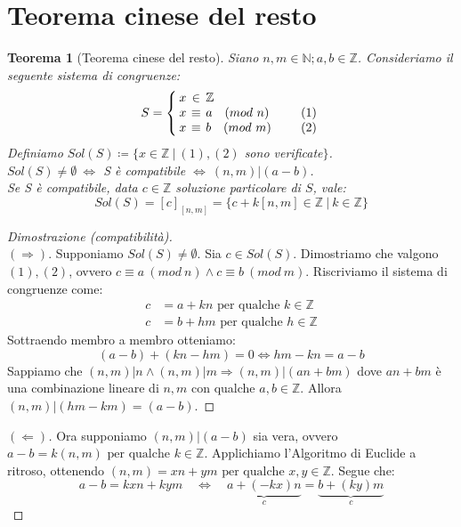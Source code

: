 \documentclass[12pt,twoscolu]{article}
\newcommand{\N}{\mathbb{N}}
\newcommand{\Z}{\mathbb{Z}}
\newcommand{\sesolose}{\Leftrightarrow}
\newcommand{\implica}{\Longrightarrow}
\newcommand{\pq}{\text{ per qualche }}
\renewcommand\qedsymbol{$\blacksquare$}
\newtheorem{theorem}{Teorema}
\begin{document}
\section{Teorema cinese del resto}
\begin{theorem}[Teorema cinese del resto]
Siano $n, m \in \N; a, b \in \Z$. Consideriamo il seguente sistema di congruenze:
\[
S = \left\{
\setlength\arraycolsep{2pt}
\begin{array}{rclc} x& \in &\Z & \\ x & \equiv &a\quad (mod\ n) &\qquad (1) \\ x & \equiv& b\quad (mod \ m)& \qquad (2) 
\end{array}\right
.
\]
Definiamo $Sol(S) \coloneqq \{ x \in \Z \ |\ (1), (2)$ sono verificate$\}$.
\\ $Sol(S) \ne \emptyset \ \sesolose$ S è compatibile $ \sesolose \ (n,m) | (a-b)$.
\\ Se S è compatibile, data $c \in \Z$ soluzione particolare di $S$, vale:
$$Sol(S) = [c]_{[n,m]} = \{ c + k[n,m] \in \Z \ |\ k \in \Z\}$$
\end{theorem}

\renewcommand\qedsymbol{$\square$}
\begin{proof}[Dimostrazione (compatibilità)]\ \\
$(\implica)$.
Supponiamo $Sol(S) \ne \emptyset$. Sia $c \in Sol(S)$. Dimostriamo che valgono $(1), (2)$, ovvero $c \equiv a\ (mod \ n) \land c \equiv b\ (mod \ m)$. Riscriviamo il sistema di congruenze come:
\begin{align*}c &= a + kn \pq k \in \Z \\
c &= b + hm \pq h \in \Z
\end{align*}
Sottraendo membro a membro otteniamo:
$$ (a-b) + (kn - hm) = 0 \sesolose hm-kn = a-b $$
Sappiamo che $(n, m)|n \land (n,m)|m \implica (n,m)|(an+bm)$ dove $an + bm$ è una combinazione lineare di $n, m$ con qualche $a, b \in \Z$. Allora $(n, m) | (hm - km) = (a - b)$.
\end{proof}

\begin{proof}[$(\Longleftarrow)$]
Ora supponiamo $(n, m) | (a - b)$ sia vera, ovvero $a -b = k(n,m) \pq k \in \Z$. Applichiamo l'Algoritmo di Euclide a ritroso, ottenendo $(n, m) = xn + ym \pq x, y \in \Z$. Segue che:
$$ a - b = kxn + kym \quad\sesolose\quad \underbrace{a + (-kx)n}_c  =  \underbrace{b +(ky)m}_c $$
\end{proof}
\end{document}
